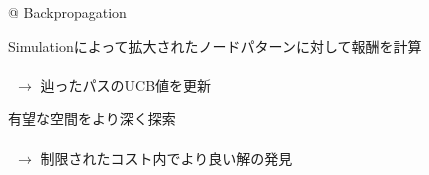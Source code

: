 \begin{tcolorbox}[colbacktitle=gray, title={\fontsize{35pt}{0pt}\selectfont 特徴探索}]
	\vspace{40pt}
	\begin{easylist}[itemize]
		@ Backpropagation
		\vspace{10pt}
	\end{easylist}
	\hspace*{60pt}
	Simulationによって拡大されたノードパターンに対して報酬を計算\\
	\vspace{10pt}\\
	\hspace*{60pt}
	$~~ \rightarrow$ 辿ったパスのUCB値を更新

	\vspace{80pt}
	\fontsize{34pt}{0pt} \selectfont
	有望な空間をより深く探索\\
	\vspace{10pt}\\
	$~~ \rightarrow$ 制限されたコスト内でより良い解の発見
\end{tcolorbox}
